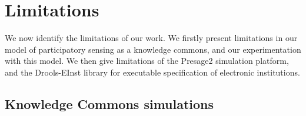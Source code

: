 



\section{Limitations}

We now identify the limitations of our work. We firstly present limitations in
our model of participatory sensing as a knowledge commons, and our
experimentation with this model. We then give limitations of the Presage2
simulation platform, and the Drools-EInst library for executable specification
of electronic institutions.

\subsection{Knowledge Commons simulations}

